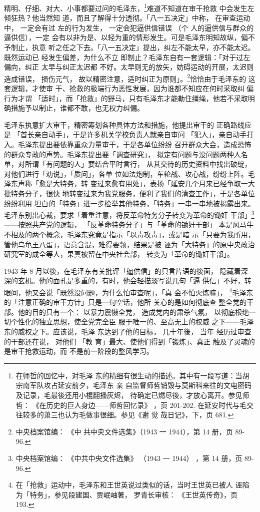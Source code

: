 精明、仔细、对大、小事都要过问的毛泽东，\footnote{在师哲的回忆中，对毛泽
东的精细有很生动的描述。其中有一段写道：当胡宗南军队攻占延安前夕，毛泽东
亲 自监督师哲销毁与莫斯科来往的文电密码及记录，毛最後还用小棍翻播灰烬，
待确定已燃尽後，才放心离开。参见师 哲： 《在历史的巨人身边——师哲回忆录》
，页 201-202. 在延安时代与毛交往较多的萧三也认为毛做事很细。参见《谢 觉
哉日记》，下，页 681.  }难道不知道在审干抢救 中会发生左倾狂热？他当然知
道，而且了解得十分透彻。「八一五决定」中称， 在审查运动中， 一定会有过
左的行为发生， 一定会犯逼供信错误 （个 人的逼供信与群众的逼供信），一定
会有以非为是、以轻为重的情形发生。可是毛泽东明知故纵，偏不予制止，执意
听之任之下去。「八一五决定」提出，纠左不能太早，亦不能太迟。既然运动已
经发生偏差，为什么不立 即制止？毛泽东自有一套逻辑：「对于过左偏向，纠正
太早与纠正太迟都 不好。太早则无的放矢，妨碍运动的开展，太迟则造成错误，
损伤元气， 故以精密注意，适时纠正为原则」。\footnote{中央档案馆编： 《中
共中央文件选集》（1943 一 1944），第 14 册，页 89-96.}恰恰由于毛泽东的
这套逻辑，才使审 干、抢救的极端行为恶性发展，因为谁都不知应在何时采取纠
偏行为才谓
「适时」，而「抢救」的野马，只有毛泽东才能勒住缰绳，他若不采取明
确措施予以制止，谁都不敢，也无权力纠偏。

毛泽东执意扩大审干，精密筹划各种具体方法和措施，他提出审干的
正确路线应是
「首长亲自动手」，于是许多机关学校负责人就亲自审问
「犯人」，亲自动手打入。毛泽东提出要依靠重众力量审干，于是各单位纷纷
召开群众大会，造成恐怖的群众专政的声势。毛泽东提出要「调查研究」，
拟定有问题与没问题两种人名单，对所谓「有问题的人」要结合平时言行，
从其交待的历史资料中找出破绽，对他们进行「劝说」，「质问」，各单
位如法炮制，车轮战、攻心战，纷纷上阵。毛泽东声称「愈是大特务，转
变过来愈有用处」，表扬「延安几个月来已经争取一大批特务分子，很快
地转变过来为我党服务，便利了我们的清查工作」，于是各单位纷纷利用
坦白的「特务」进一步检举其他特务，「特务」一串一串地被揭露出来。
毛泽东别出心裁，要求「着重注意，将反革命特务分子转变为革命的锄奸
干部」\footnote{中央档案馆编：
《中共中央文件选集》
（1943 一 1944）
，第 14 册，页 89-96.} ——按照共产党的逻辑，
「反革命特务分子」与「革命的锄奸干部」
本是风马牛不相及的两个概念，毛泽东究竟是指示「以毒攻毒」，或是暗
示「只要为我所用，管他乌龟王八蛋」，语意含混，难得要领，结果是被
诬为「大特务」的原中央政治研究室的成全等人，果真被留在中央社会部，
转变为「革命的锄奸干部」。

1943 年 8 月以後，在毛泽东有关批评「逼供信」的只言片语的後面， 隐藏着深
深的玄机。他的面孔是多重的，有时，他会轻描淡写说几句「逼 供信」不好，转
眼间，他又会说「既然没问题，为什么怕审查呢」，「真 金不怕火炼嘛」，
\footnote{在「抢救」运动中，毛泽东和王世英说过类似的话，当时王世英已被人
诬陷为「特务」，参见段建国、贾岷岫著， 罗青长审核： 《王世英传奇》，页
193.}毛泽东的「注意正确的审干方针」只是一句空话，他所 关心的是如何彻底查
整全党的干部。他的目的只有一个： 以暴力震慑全党， 造成党内的肃杀气氛，
以彻底根绝一切个性化的独立思想，使全党完全臣 服于唯一的、至高无上的权威
之下——毛泽东的威权之下。应该说，毛泽 东达到了他的目标， 几十年後， 当年
经历过审查的干部还在说， 对他们 「教 育」最大、使他们得到「锻炼」、真正
触及了灵魂的是审干抢救运动，而 不是前一阶段的整风学习。
 
